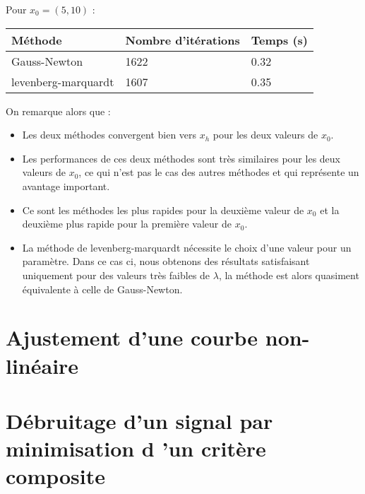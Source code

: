 \documentclass[12pt,a4paper,titlepage]{article}
\begin{document}
\begin{enumerate}
{            Pour $x_0 = (5,10)$ :

            \begin{table}[H]
                \begin{tabularx}{\textwidth}{ |l|X|X| }
                    \hline
                    Méthode & Nombre d'itérations & Temps (s) \\
                    \hline
                    Gauss-Newton & 1622 & 0.32 \\
                    \hline
                    levenberg-marquardt & 1607 & 0.35 \\
                    \hline
                \end{tabularx}
            \end{table}

            On remarque alors que :

            \begin{itemize}
                \item{Les deux méthodes convergent bien vers $x_h$ pour les deux valeurs de $x_0$.}
                \item{Les performances de ces deux méthodes sont très similaires pour les
                        deux valeurs de $x_0$, ce qui n'est pas le cas des autres méthodes et
                    qui représente un avantage important.}
                \item{Ce sont les méthodes les plus rapides pour la deuxième valeur de $x_0$ et
                    la deuxième plus rapide pour la première valeur de $x_0$.}
                \item{La méthode de levenberg-marquardt nécessite le choix d'une valeur pour
                        un paramètre. Dans ce cas ci, nous obtenons des résultats satisfaisant
                        uniquement pour des valeurs très faibles de $\lambda$, la méthode est 
                    alors quasiment équivalente à celle de Gauss-Newton.}
            \end{itemize}
        }

\end{enumerate}

\newpage
\section{Ajustement d'une courbe non-linéaire}

\newpage
\section{Débruitage d’un signal par minimisation d ’un critère composite}
\end{document}
